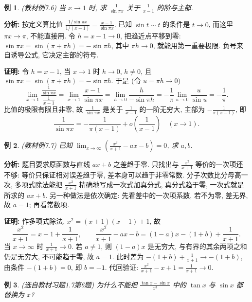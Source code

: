 \documentclass[UTF8,openany]{ctexbook}
\theoremstyle{chinesetextbook}
\newtheorem{example}{例}[section]
\newenvironment{cnproof}{\par\indent\textbf{证明:} \ignorespaces}{\par}
\begin{document}
\begin{example}
\textnormal{(教材例7.6)} 当 $x\to1$ 时, 求 $\displaystyle \frac1{\sin\pi x}$ 关于 $\displaystyle \frac1{x-1}$ 的阶与主部.
\end{example}
\par\indent\textbf{分析:} 按定义算比值 $\displaystyle\frac{1/\sin\pi x}{1/(x-1)}=\frac{x-1}{\sin\pi x}$. 已知 $\sin t\sim t$ 的条件是 $t\to0$, 而这里 $\pi x\to\pi$, 不能直接用. 令 $h=x-1\to0$, 把趋近点平移到零: $\sin\pi x=\sin(\pi+\pi h)=-\sin\pi h$, 其中 $\pi h\to0$, 就能用第一重要极限. 负号来自诱导公式, 它决定主部的符号.
\begin{cnproof}
令 $h=x-1$, 当 $x\to1$ 时 $h\to0$, $h\ne0$, 且 $\sin\pi x=\sin(\pi+\pi h)=-\sin\pi h$. 于是 (令 $u=\pi h\to0$)
\[
\lim_{x\to1}\frac{\frac1{\sin\pi x}}{\frac1{x-1}}
=\lim_{x\to1}\frac{x-1}{\sin\pi x}
=\lim_{h\to0}\frac{h}{-\sin\pi h}
=-\frac1\pi\lim_{u\to0}\frac{u}{\sin u}=-\frac1\pi.
\]
比值的极限有限且非零, 故 $\displaystyle\frac1{\sin\pi x}$ 是关于 $\displaystyle\frac1{x-1}$ 的一阶无穷大, 主部为 $\displaystyle-\frac1{\pi(x-1)}$, 即
\[
\frac1{\sin\pi x}=-\frac1{\pi(x-1)}+o\!\left(\frac1{x-1}\right)\quad(x\to1).
\]
\end{cnproof}
\begin{example}
\textnormal{(教材例7.7)} 已知 $\displaystyle \lim_{x\to\infty}\left(\frac{x^2}{x+1}-ax-b\right)=0$, 求 $a,b$.
\end{example}
\par\indent\textbf{分析:} 题目要求原函数与直线 $ax+b$ 之差趋于零. 只找出与 $\displaystyle\frac{x^2}{x+1}$ 等价的一次项还不够: 等价只保证相对误差趋于零, 差本身可以趋于非零常数. 分子次数比分母高一次, 多项式除法能把 $\displaystyle\frac{x^2}{x+1}$ 精确地写成一次式加真分式, 真分式趋于零, 一次式就是所求的 $ax+b$. 另一种做法是依次确定: 先看差中的一次项系数, 若不为零, 差无界, 故 $a=1$; 再看常数项.
\begin{cnproof}
作多项式除法, $x^2=(x+1)(x-1)+1$, 故
\[
\frac{x^2}{x+1}=x-1+\frac1{x+1},
\qquad
\frac{x^2}{x+1}-ax-b=(1-a)x-(1+b)+\frac1{x+1}.
\]
当 $x\to\infty$ 时 $\displaystyle\frac1{x+1}\to0$. 若 $a\ne1$, 则 $(1-a)x$ 是无穷大, 与有界的其余两项之和仍是无穷大, 不可能趋于零, 故 $a=1$. 此时差为 $\displaystyle-(1+b)+\frac1{x+1}\to-(1+b)$, 由条件 $-(1+b)=0$, 即 $b=-1$. 代回验证: $\displaystyle\frac{x^2}{x+1}-x+1=\frac1{x+1}\to0$.
\end{cnproof}
\begin{example}
\textnormal{(选自教材习题1.7第6题)} 为什么不能把 $\displaystyle \frac{\tan x-\sin x}{x^3}$ 中的 $\tan x$ 与 $\sin x$ 都替换为 $x$?
\end{example}
\end{document}
